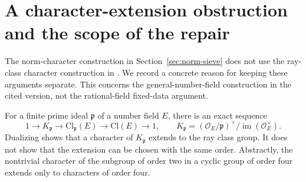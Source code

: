\documentclass[11pt,reqno]{amsart}
\numberwithin{equation}{section}
\theoremstyle{definition}
\theoremstyle{remark}
\begin{document}
\appendix
\section{A character-extension obstruction and the scope of the repair}\label{app:jiang}

The norm-character construction in Section~\ref{sec:norm-sieve} does not use the ray-class character construction in \cite[\S4.1]{Jiang}. We record a concrete reason for keeping these arguments separate. This concerns the general-number-field construction in the cited version, not the rational-field fixed-data argument.

For a finite prime ideal $\mathfrak p$ of a number field $E$, there is an exact sequence
\begin{equation}\label{ns:ray-sequence}
1\longrightarrow K_{\mathfrak p}\longrightarrow\mathrm{Cl}_{\mathfrak p}(E)
\longrightarrow\mathrm{Cl}(E)\longrightarrow1,
\qquad
K_{\mathfrak p}=(\mathcal O_E/\mathfrak p)^\times/
                \operatorname{im}(\mathcal O_E^\times).
\end{equation}
Dualizing shows that a character of $K_{\mathfrak p}$ extends to the ray class group. It does not show that the extension can be chosen with the same order. Abstractly, the nontrivial character of the subgroup of order two in a cyclic group of order four extends only to characters of order four.
\end{document}
